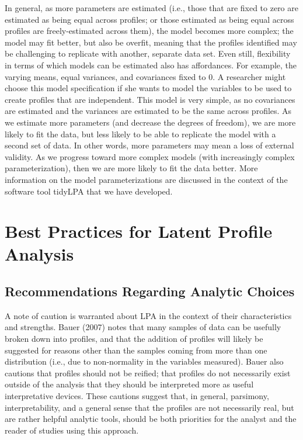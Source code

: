 \documentclass[man]{apa6}
\begin{document}
In general, as more parameters are estimated (i.e., those that are fixed to zero
are estimated as being equal across profiles; or those estimated as being equal
across profiles are freely-estimated across them), the model becomes more
complex; the model may fit better, but also be overfit, meaning that the
profiles identified may be challenging to replicate with another, separate data
set. Even still, flexibility in terms of which models can be estimated also has
affordances. For example, the varying means, equal variances, and covariances
fixed to 0. A researcher might choose this model specification if she wants to
model the variables to be used to create profiles that are independent. This
model is very simple, as no covariances are estimated and the variances are
estimated to be the same across profiles. As we estimate more parameters (and
decrease the degrees of freedom), we are more likely to fit the data, but less
likely to be able to replicate the model with a second set of data. In other
words, more parameters may mean a loss of external validity. As we progress
toward more complex models (with increasingly complex parameterization), then we
are more likely to fit the data better. More information on the model
parameterizations are discussed in the context of the software tool tidyLPA that
we have developed.

\hypertarget{best-practices-for-latent-profile-analysis}{%
\section{Best Practices for Latent Profile Analysis}\label{best-practices-for-latent-profile-analysis}}

\hypertarget{recommendations-regarding-analytic-choices}{%
\subsection{Recommendations Regarding Analytic Choices}\label{recommendations-regarding-analytic-choices}}

A note of caution is warranted about LPA in the context of their characteristics
and strengths. Bauer (2007) notes that many samples of data can be usefully
broken down into profiles, and that the addition of profiles will likely be
suggested for reasons other than the samples coming from more than one
distribution (i.e., due to non-normality in the variables measured). Bauer also
cautions that profiles should not be reified; that profiles do not necessarily
exist outside of the analysis that they should be interpreted more as useful
interpretative devices. These cautions suggest that, in general, parsimony,
interpretability, and a general sense that the profiles are not necessarily
real, but are rather helpful analytic tools, should be both priorities for the
analyst and the reader of studies using this approach.
\end{document}
